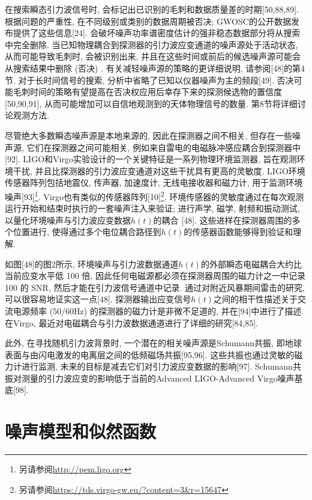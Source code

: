 \documentclass[a4paper]{\documentclassname}
\def\t{\text}
\theoremstyle{definition}
\begin{document}
在搜索瞬态引力波信号时, 会标记出已识别的毛刺和数据质量差的时期[50,88,89]. 根据问题的严重性, 在不同级别或类别的数据周期被否决; GWOSC的公开数据发布提供了这些信息[24]. 会破坏噪声功率谱密度估计的强非稳态数据部分将从搜索中完全删除. 当已知物理耦合到探测器的引力波应变通道的噪声源处于活动状态, 从而可能导致毛刺时, 会被识别出来, 并且在这些时间或前后的候选噪声源可能会从搜索结果中删除 (否决) . 有关减轻噪声源的策略的更详细说明, 请参阅[48]的第4节. 对于长时间信号的搜索, 分析中省略了已知以仪器噪声为主的频段[49]. 否决可能毛刺时间的策略有望提高在否决权应用后幸存下来的探测候选物的置信度[50,90,91], 从而可能增加可以自信地观测到的天体物理信号的数量. 第8节将详细讨论观测方法. 

尽管绝大多数瞬态噪声源是本地来源的, 因此在探测器之间不相关, 但存在一些噪声源, 它们在探测器之间可能相关, 例如来自雷电的电磁脉冲感应耦合到探测器中[92]. LIGO和Virgo实验设计的一个关键特征是一系列物理环境监测器, 旨在观测环境干扰, 并且比探测器的引力波应变通道对这些干扰具有更高的灵敏度. LIGO环境传感器阵列包括地震仪, 传声器, 加速度计, 无线电接收器和磁力计, 用于监测环境噪声[93]\footnote{另请参阅\href{http://pem.ligo.org}{http://pem.ligo.org}}.  Virgo也有类似的传感器阵列[10]\footnote{另请参阅\href{https://tds.virgo-gw.eu/?content=3&r=15647}{https://tds.virgo-gw.eu/?content=3\&{}r=15647}}. 环境传感器的灵敏度通过在每次观测运行开始和结束时执行的一套噪声注入来验证; 进行声学, 磁学, 射频和振动测试, 以量化环境噪声与引力波应变数据$h(t)$的耦合 [48]. 这些进样在探测器周围的多个位置进行, 使得通过多个电位耦合路径到$h(t)$的传感器函数能够得到验证和理解. 

如图[48]的图2所示, 环境噪声与引力波数据通道$h(t)$的外部瞬态电磁耦合大约比当前应变水平低 100 倍, 因此任何电磁源都必须在探测器周围的磁力计之一中记录 100 的 SNR, 然后才能在引力波信号通道中记录. 通过对附近风暴期间雷击的研究, 可以很容易地证实这一点[48]. 探测器输出应变信号$h(t)$之间的相干性描述关于交流电源频率 ($50/60 \t{Hz}$) 的探测器的磁力计是非微不足道的, 并在[94]中进行了描述. 在Virgo, 最近对电磁耦合与引力波数据通道进行了详细的研究[84,85]. 

此外, 在寻找随机引力波背景时, 一个潜在的相关噪声源是Schumann共振, 即地球表面与由闪电激发的电离层之间的低频磁场共振[95,96].  这些共振也通过灵敏的磁力计进行监测, 未来的目标是减去它们对引力波应变数据的影响[97]. Schumann共振对测量的引力波应变的影响低于当前的Advanced LIGO-Advanced Virgo噪声基底[98]. 

\section{噪声模型和似然函数}
\end{document}
